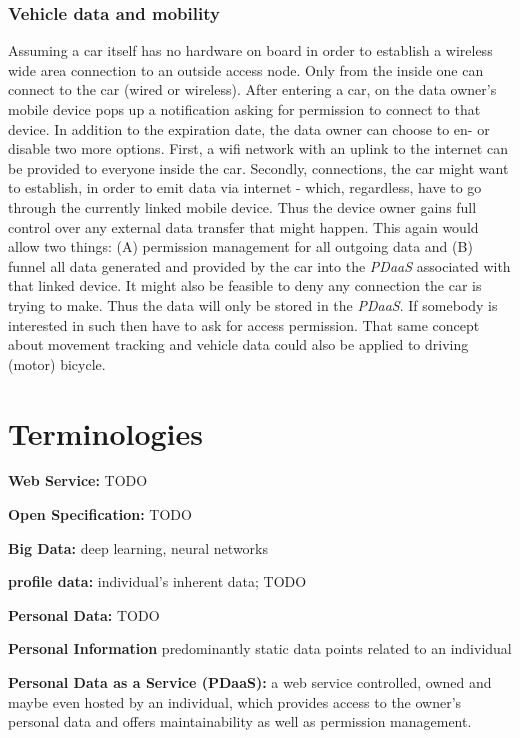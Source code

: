 \documentclass[12pt,english,a4paper,titlepage,cleardoublepage=empty,dottedtoc]{report}
\begin{document}
\subsubsection{Vehicle data and
mobility}\label{vehicle-data-and-mobility}

Assuming a car itself has no hardware on board in order to establish a
wireless wide area connection to an outside access node. Only from the
inside one can connect to the car (wired or wireless). After entering a
car, on the data owner's mobile device pops up a notification asking for
permission to connect to that device. In addition to the expiration
date, the data owner can choose to en- or disable two more options.
First, a wifi network with an uplink to the internet can be provided to
everyone inside the car. Secondly, connections, the car might want to
establish, in order to emit data via internet - which, regardless, have
to go through the currently linked mobile device. Thus the device owner
gains full control over any external data transfer that might happen.
This again would allow two things: (A) permission management for all
outgoing data and (B) funnel all data generated and provided by the car
into the \emph{PDaaS} associated with that linked device. It might also
be feasible to deny any connection the car is trying to make. Thus the
data will only be stored in the \emph{PDaaS}. If somebody is interested
in such then have to ask for access permission. That same concept about
movement tracking and vehicle data could also be applied to driving
(motor) bicycle.

\section{Terminologies}\label{terminologies}

\textbf{Web Service:} TODO

\textbf{Open Specification:} TODO

\textbf{Big Data:} deep learning, neural networks

\textbf{profile data:} individual's inherent data; TODO

\textbf{Personal Data:} TODO

\textbf{Personal Information} predominantly static data points related
to an individual

\textbf{Personal Data as a Service (PDaaS):} a web service controlled,
owned and maybe even hosted by an individual, which provides access to
the owner's personal data and offers maintainability as well as
permission management.
\end{document}
